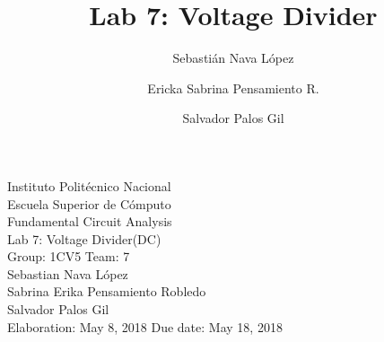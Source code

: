 \documentclass[letterpaper]{article}
\title{Lab 7: Voltage Divider}
\author{
    Sebastián Nava López\\
    \and
    Ericka Sabrina Pensamiento R.\\
    \and
    Salvador Palos Gil
}
\begin{document}
\begin{titlepage}
    \centering
    {\Huge Instituto Politécnico Nacional}\\[3ex]
    {\huge Escuela Superior de Cómputo}\\[8ex]
    {\huge Fundamental Circuit Analysis}\\[12ex]
    {\Large Lab 7: Voltage Divider(DC)}\\[20ex]
    {\Large Group: 1CV5 Team: 7 \\[8ex]
    Sebastian Nava López\\[4ex]
    Sabrina Erika Pensamiento Robledo\\[4ex]
    Salvador Palos Gil\\[18ex]
    }
    \large{Elaboration: May 8, 2018 \hspace{8em} Due date: May 18, 2018}
\end{titlepage}
\tableofcontents
\newpage
\end{document}
